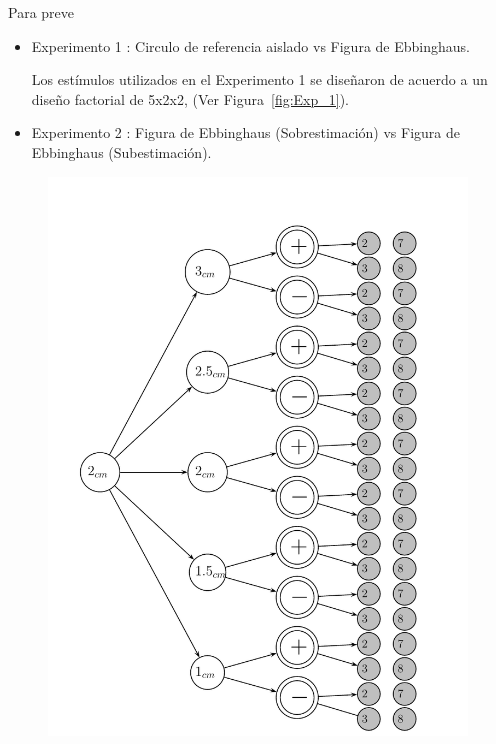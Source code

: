 Para preve\\

\begin{itemize}
\item Experimento 1 : Circulo de referencia aislado vs Figura de Ebbinghaus.

Los estímulos utilizados en el Experimento 1 se diseñaron de acuerdo a un diseño factorial de 5x2x2, (Ver Figura~\ref{fig:Exp_1}). 
 

\item Experimento 2 : Figura de Ebbinghaus (Sobrestimación) vs Figura de Ebbinghaus (Subestimación).
\end{itemize}



\begin{figure}[th]
\centering
\includegraphics[width=0.99\textwidth]{Figures/Estimulos_Experimento1} 
\decoRule

\end{figure}
